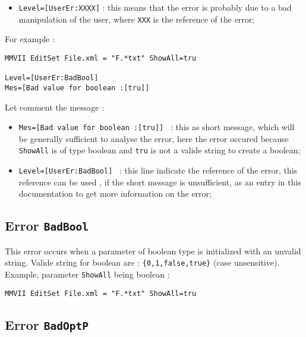\documentclass[a4paper]{book}
\begin{document}
{\begin{itemize}
   \item {\tt Level=[UserEr:XXXX]} : this means that the error is probably due to a bad
        manipulation of the user, where {\tt XXX}  is the reference of the error;
\end{itemize}

For example :

\begin{verbatim}
MMVII EditSet File.xml = "F.*txt" ShowAll=tru

Level=[UserEr:BadBool]
Mes=[Bad value for boolean :[tru]]
\end{verbatim}

Let comment the message :

\begin{itemize}
   \item {\tt Mes=[Bad value for boolean :[tru]] } : this as short message, which will be generally
         sufficient to analyse the error, here the error occured because {\tt ShowAll} is of type
         boolean and {\tt tru} is not a valide string to create a boolean;

   \item {\tt Level=[UserEr:BadBool] } : this line indicate the reference of the error,
         this reference can be used , if the short message is unsufficient, as an entry in this
         documentation to get more information on the error;

\end{itemize}


\subsection{Error {\tt BadBool}}

This error occurs when a parameter of boolean type is initialized with an unvalid string.
Valide string for boolean are : {\tt \{0,1,false,true\}} (case unsensitive).
Example, parameter {\tt ShowAll} being boolean :

\begin{verbatim}
MMVII EditSet File.xml = "F.*txt" ShowAll=tru
\end{verbatim}


\subsection{Error {\tt BadOptP}}

}
\end{document}
